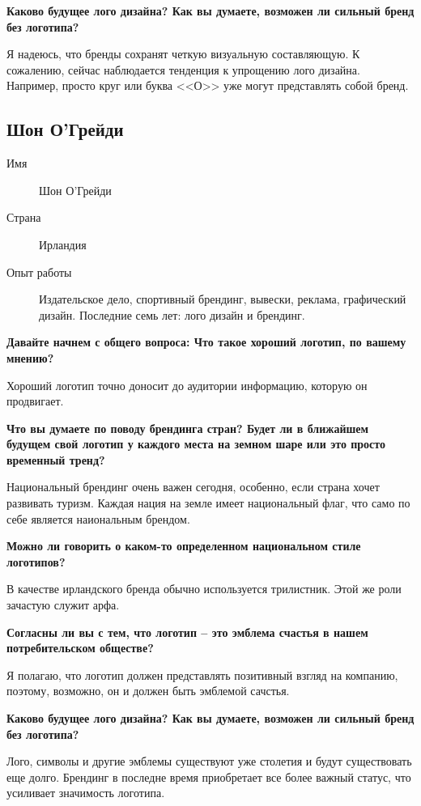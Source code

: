 \textbf{Каково будущее лого дизайна? Как вы думаете, возможен ли сильный бренд без логотипа?}

Я надеюсь, что бренды сохранят четкую визуальную составляющую. К сожалению, сейчас наблюдается тенденция к упрощению лого дизайна. Например, просто круг или буква <<О>> уже могут представлять собой бренд.



\clearpage
\subsection{Шон О'Грейди}

\begin{description}
\item[Имя] Шон О'Грейди
\item[Страна] Ирландия
\item[Опыт работы] Издательское дело, спортивный брендинг, вывески, реклама, графический дизайн. Последние семь лет: лого дизайн и брендинг. 
\end{description}

\textbf{Давайте начнем с общего вопроса: Что такое хороший логотип, по вашему мнению?}

Хороший логотип точно доносит до аудитории информацию, которую он продвигает.


\textbf{Что вы думаете по поводу брендинга стран? Будет ли в ближайшем будущем свой логотип у каждого места на земном шаре или это просто временный тренд?}

Национальный брендинг очень важен сегодня, особенно, если страна хочет развивать туризм. Каждая нация на земле имеет национальный флаг, что само по себе является наиональным брендом. 


\textbf{Можно ли говорить о каком-то определенном национальном стиле логотипов?}

В качестве ирландского бренда обычно используется трилистник. Этой же роли зачастую служит арфа. 


\textbf{Согласны ли вы с тем, что логотип – это эмблема счастья в нашем потребительском обществе?}

Я полагаю, что логотип должен представлять позитивный взгляд на компанию, поэтому, возможно, он и должен быть эмблемой сачстья. 


\textbf{Каково будущее лого дизайна? Как вы думаете, возможен ли сильный бренд без логотипа?}

Лого, символы и другие эмблемы существуют уже столетия и будут существовать еще долго. Брендинг в последне время приобретает все более важный статус, что усиливает значимость  логотипа.



